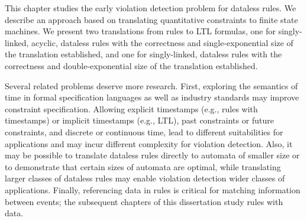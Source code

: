 This chapter studies the early violation detection problem for dataless rules.
We describe an approach
based on translating quantitative constraints to finite state machines.
We present two translations from rules to LTL formulas,
one for singly-linked, acyclic, dataless rules
with the correctness and single-exponential size of the translation established,
and one for singly-linked, dataless rules
with the correctness and double-exponential size of the translation established.

Several related problems deserve more research.
First, exploring the semantics of time
in formal specification languages
as well as industry standards
may improve constraint specification.
Allowing
explicit timestamps (e.g., rules with timestamps)
or implicit timestamps (e.g., LTL),
past constraints or future constraints,
and
discrete or continuous time,
lead to different suitabilities for applications
and may incur different complexity for violation detection.
Also, 
it may be possible to translate dataless rules directly to automata of smaller size
or to demonstrate that certain sizes of automata are optimal,
while translating larger classes of dataless rules
may enable violation detection wider classes of applications.
Finally,
referencing data in rules is critical for matching information between events;
the subsequent chapters of this dissertation
study rules with data.